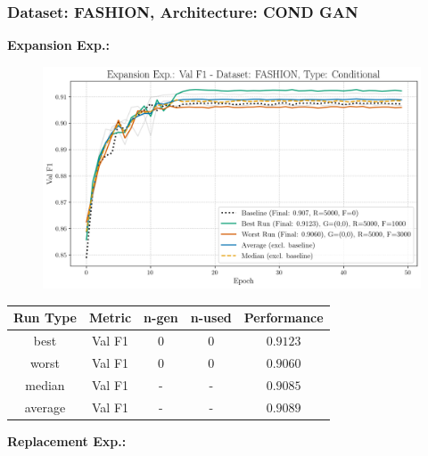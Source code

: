 \subsubsection{Dataset: FASHION, Architecture: COND GAN}
\noindent\textbf{Expansion Exp.:}
\begin{figure}[htbp]
	\centering
	\includegraphics[width=.85\textwidth]{abb/strat_classifier_performance/FASHION_STRATIFIED_CLASSIFIERS_COND_GAN/expansion_experiments/val_f1_score_['COND']_FASHION_all.png}
	\label{fig:app_strat_class_performance_expansion_exp._val_f1_score_}
\end{figure}
\begin{table}[H]
	\centering
	\vspace{-1em}
	\begin{tabular}{|c|c|c|c|c|}
		\hline
		Run Type & Metric & n-gen & n-used & Performance \\ \hline
		best & Val F1 & 0 & 0 & $0.9123$\\ \hline
		worst & Val F1 & 0 & 0 & $0.9060$\\ \hline
		median & Val F1 & - & - & $0.9085$\\ \hline
		average & Val F1 & - & - & $0.9089$
		\\ \hline
	\end{tabular}
\end{table}
\noindent\textbf{Replacement Exp.:}
